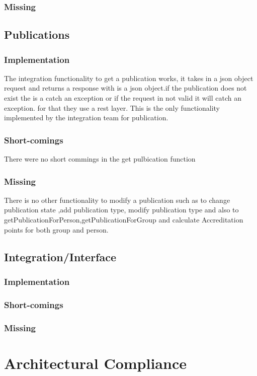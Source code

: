 \documentclass{article}
\begin{document}
		\subsubsection{Missing}
		
	\subsection{Publications}
		\subsubsection{Implementation}
			The integration functionality to get a publication works, it takes in a json object request and returns a response with is a json object.if the publication does not exist the is a catch an exception or if the request in not valid it will catch an exception. for that they use a rest layer. This is the only functionality implemented by the integration team for publication.
		\subsubsection{Short-comings}
		There were no short commings in the get pulbication function
		\subsubsection{Missing}
		There is no other functionality to modify a publication such as to change publication state ,add publication type, modify publication type and also to getPublicationForPerson,getPublicationForGroup and calculate Accreditation points for both group and person.
		
	\subsection{Integration/Interface}
		\subsubsection{Implementation}
		\subsubsection{Short-comings}
		\subsubsection{Missing}

\section{Architectural Compliance}
\end{document}
